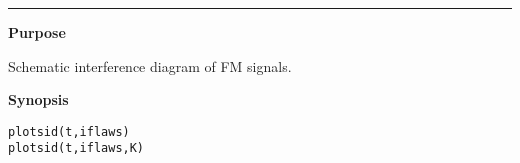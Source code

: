 


\hspace*{-1.6cm}{\Large \bf plotsid}

\vspace*{-.4cm}
\hspace*{-1.6cm}\rule[0in]{16.5cm}{.02cm}
\vspace*{.2cm}



{\bf \large {}\selectfont Purpose}\\
\hspace*{1.5cm}
\begin{minipage}[t]{13.5cm}
Schematic interference diagram of FM signals. 
\end{minipage}
\vspace*{.5cm}


{\bf \large {}\selectfont Synopsis}\\
\hspace*{1.5cm}
\begin{minipage}[t]{13.5cm}
\begin{verbatim}
plotsid(t,iflaws)
plotsid(t,iflaws,K)
\end{verbatim}
\end{minipage}
\vspace*{.5cm}


